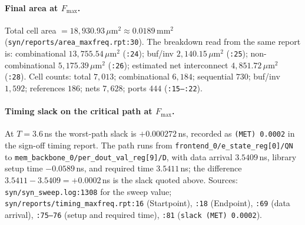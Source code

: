 \paragraph{Final area at $F_\mathrm{max}$.}
Total cell area $=18{,}930.93\,\mu\mathrm{m}^2 \approx 0.0189\,\mathrm{mm}^2$
(\texttt{syn/reports/area\_maxfreq.rpt:30}).
The breakdown read from the same report is: combinational
$13{,}755.54\,\mu\mathrm{m}^2$ (\texttt{:24}); buf/inv
$2{,}140.15\,\mu\mathrm{m}^2$ (\texttt{:25}); non-combinational
$5{,}175.39\,\mu\mathrm{m}^2$ (\texttt{:26}); estimated
net interconnect $4{,}851.72\,\mu\mathrm{m}^2$ (\texttt{:28}). Cell counts:
total $7{,}013$; combinational $6{,}184$; sequential $730$;
buf/inv $1{,}592$; references $186$; nets $7{,}628$; ports $444$
(\texttt{:15--:22}).

\paragraph{Timing slack on the critical path at $F_\mathrm{max}$.}
At $T=3.6$\,ns the worst-path slack is $+0.000272$\,ns, recorded as
\texttt{(MET) 0.0002} in the sign-off timing report. The path runs
from \texttt{frontend\_0/e\_state\_reg[0]/QN} to
\texttt{mem\_backbone\_0/per\_dout\_val\_reg[9]/D}, with data arrival
$3.5409$\,ns, library setup time $-0.0589$\,ns, and required time
$3.5411$\,ns; the difference $3.5411-3.5409=+0.0002$\,ns is the slack
quoted above. Sources:
\texttt{syn/syn\_sweep.log:1308} for the sweep value;
\texttt{syn/reports/timing\_maxfreq.rpt:16} (Startpoint),
\texttt{:18} (Endpoint), \texttt{:69} (data arrival),
\texttt{:75--76} (setup and required time), \texttt{:81}
(\texttt{slack (MET) 0.0002}).

